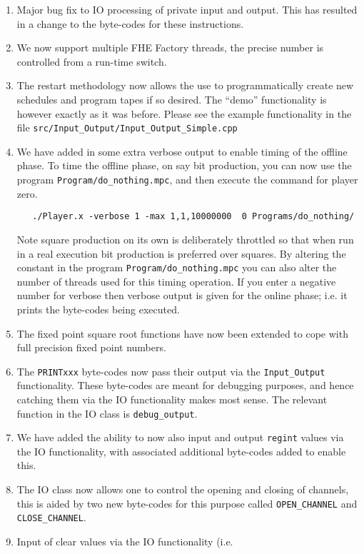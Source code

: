 \begin{enumerate}
\item Major bug fix to IO processing of private input and output.
This has resulted in a change to the byte-codes for these instructions.
\item We now support multiple FHE Factory threads, the precise number
is controlled from a run-time switch.
\item The restart methodology now allows the use to programmatically
create new schedules and program tapes if so desired. The
``demo'' functionality is however exactly as it was before.
Please see the example functionality in the file
\verb+src/Input_Output/Input_Output_Simple.cpp+
\item We have added in some extra verbose output to enable timing of the
offline phase. To time the offline phase, on say bit production,
you can now use the program \verb+Program/do_nothing.mpc+, and then
execute the command for player zero.
\begin{verbatim}
   ./Player.x -verbose 1 -max 1,1,10000000  0 Programs/do_nothing/
\end{verbatim}
Note square production on its own is deliberately throttled
so that when run in a real execution bit production is preferred
over squares.
By altering the constant in the program  \verb+Program/do_nothing.mpc+
you can also alter the number of threads used for this timing operation.
If you enter a negative number for verbose then verbose output
is given for the online phase; i.e. it prints the byte-codes being
executed.
\item The fixed point square root functions have now been extended to
cope with full precision fixed point numbers.
\item The \verb+PRINTxxx+ byte-codes now pass their output via the
\verb+Input_Output+ functionality. These byte-codes are meant for
debugging purposes, and hence catching them via the IO functionality
makes most sense. The relevant function in the IO class
is \verb+debug_output+.
\item We have added the ability to now also input and output \verb+regint+
values via the IO functionality, with associated additional byte-codes
added to enable this.
\item The IO class now allows one to control the opening and closing of
channels, this is aided by two new byte-codes for this purpose
called \verb+OPEN_CHANNEL+ and \verb+CLOSE_CHANNEL+.
\item Input of clear values via the IO functionality (i.e.

\end{enumerate}
